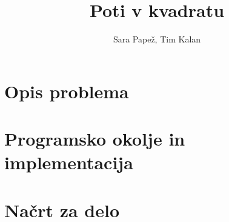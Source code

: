 \documentclass[a4paper]{article}
\title{Poti v kvadratu}
\author{Sara Papež, Tim Kalan}
\begin{document}
\begin{titlepage}
 \maketitle

\end{titlepage}

\section{Opis problema}
\section{Programsko okolje in implementacija}
\section{Načrt za delo}
\end{document}
